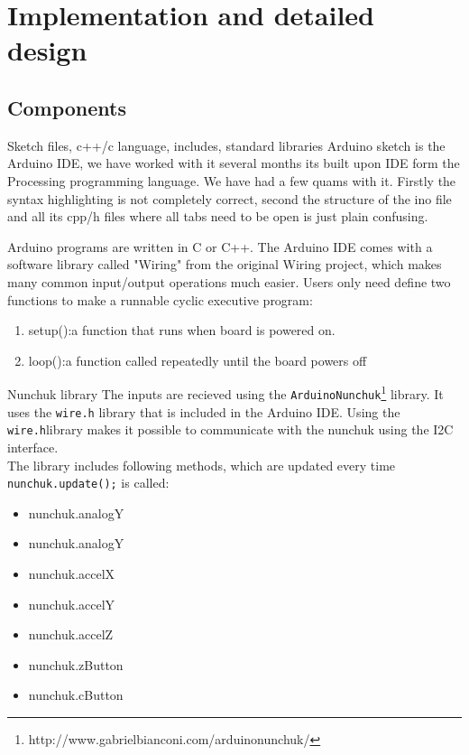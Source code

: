\chapter{Implementation and detailed design} %

\section{Components}
Sketch files, c++/c language, includes, standard libraries
Arduino sketch is the Arduino IDE, we have worked with it several months its built upon IDE form the Processing programming language. We have had a few quams with it. Firstly the syntax highlighting is not completely correct, second the structure of the ino file and all its cpp/h files where all tabs need to be open is just plain confusing.

Arduino programs are written in C or C++. The Arduino IDE comes with a software library called "Wiring" from the original Wiring project, which makes many common input/output operations much easier. Users only need define two functions to make a runnable cyclic executive program: 
\begin{enumerate}
\item setup():a function that runs when board is powered on.
\item loop():a function called repeatedly until the board powers off
\end{enumerate}
Nunchuk library
The inputs are recieved using the {\tt ArduinoNunchuk}\footnote{http://www.gabrielbianconi.com/arduinonunchuk/} library.
It uses the {\tt wire.h} library that is included in the Arduino IDE.
Using the {\tt wire.h}library makes it possible to communicate with the
nunchuk using the I2C interface.\\
The library includes following methods, which are updated every time {\tt nunchuk.update();} is called:\\
\begin{multicols}{2}
\begin{itemize}
    \item nunchuk.analogY
    \item nunchuk.analogY
    \item nunchuk.accelX
    \item nunchuk.accelY
    \item nunchuk.accelZ
    \item nunchuk.zButton
    \item nunchuk.cButton
\end{itemize}
\end{multicols}

